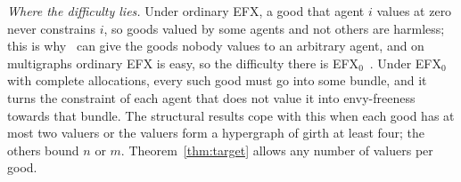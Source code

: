\documentclass[runningheads,11pt]{llncs}
\newcommand{\efxz}{\texorpdfstring{\mbox{EFX$_0$}}{EFX0}}
\begin{document}
\noindent\emph{Where the difficulty lies.} Under ordinary EFX, a good that agent $i$ values at zero never constrains $i$, so goods valued by some agents and not others are harmless; this is why~\cite{ViswanathanM24} can give the goods nobody values to an arbitrary agent, and on multigraphs ordinary EFX is easy, so the difficulty there is \efxz{}~\cite{SgouritsaS25}. Under \efxz{} with complete allocations, every such good must go into some bundle, and it turns the constraint of each agent that does not value it into envy-freeness towards that bundle. The structural results cope with this when each good has at most two valuers or the valuers form a hypergraph of girth at least four; the others bound $n$ or $m$. Theorem~\ref{thm:target} allows any number of valuers per good.
\end{document}
